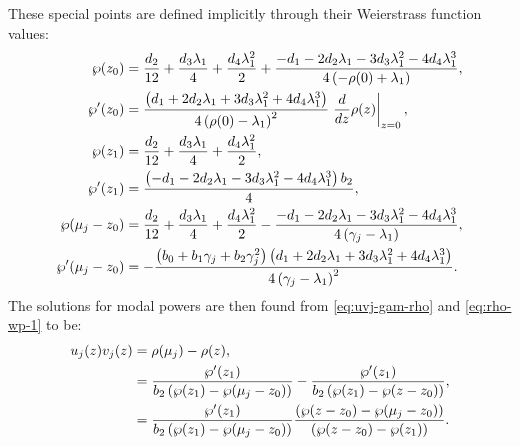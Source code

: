 \documentclass[11pt,a4paper]{article}
\numberwithin{equation}{section}
\begin{document}
These special points are defined implicitly through their Weierstrass function values:
\begin{align}
\wp{\left(z_{0}\right)} &= \frac{{d}_{2}}{12} + \frac{{d}_{3} {\lambda}_{1}}{4} + \frac{{d}_{4} {\lambda}_{1}^{2}}{2} + \frac{- {d}_{1} - 2 {d}_{2} {\lambda}_{1} - 3 {d}_{3} {\lambda}_{1}^{2} - 4 {d}_{4} {\lambda}_{1}^{3}}{4 \left(- \rho{\left(0 \right)} + {\lambda}_{1}\right)}, \notag \\
\wp'{\left(z_{0}\right)} &= \frac{\left({d}_{1} + 2 {d}_{2} {\lambda}_{1} + 3 {d}_{3} {\lambda}_{1}^{2} + 4 {d}_{4} {\lambda}_{1}^{3}\right) }{4 \left(\rho{\left(0 \right)} - {\lambda}_{1}\right)^{2}}\left. \frac{d}{d z} \rho{\left(z \right)} \right|_{\substack{ z=0 }}, \notag \\
\wp{\left(z_{1}\right)} &= \frac{{d}_{2}}{12} + \frac{{d}_{3} {\lambda}_{1}}{4} + \frac{{d}_{4} {\lambda}_{1}^{2}}{2}, \notag \\
\wp'{\left(z_{1}\right)} &= \frac{\left(- {d}_{1} - 2 {d}_{2} {\lambda}_{1} - 3 {d}_{3} {\lambda}_{1}^{2} - 4 {d}_{4} {\lambda}_{1}^{3}\right) b_2}{4}, \notag \\
\wp{\left({\mu}_{j} - z_{0}\right)} &= \frac{{d}_{2}}{12} + \frac{{d}_{3} {\lambda}_{1}}{4} + \frac{{d}_{4} {\lambda}_{1}^{2}}{2} - \frac{- {d}_{1} - 2 {d}_{2} {\lambda}_{1} - 3 {d}_{3} {\lambda}_{1}^{2} - 4 {d}_{4} {\lambda}_{1}^{3}}{4 \left({\gamma}_{j} - {\lambda}_{1}\right)}, \notag \\
\wp'{\left({\mu}_{j}- z_{0}\right)} &= - \frac{\left({b}_{0} + {b}_{1} {\gamma}_{j} + {b}_{2} {\gamma}_{j}^{2}\right) \left({d}_{1} + 2 {d}_{2} {\lambda}_{1} + 3 {d}_{3} {\lambda}_{1}^{2} + 4 {d}_{4} {\lambda}_{1}^{3}\right)}{4 \left({\gamma}_{j} - {\lambda}_{1}\right)^{2}}. \label{eq:wp-points}
\end{align}
The solutions for modal powers are then found from \eqref{eq:uvj-gam-rho} and \eqref{eq:rho-wp-1} to be:
\begin{align}
u_j{\left(z\right)} v_j{\left(z\right)} &= \rho(\mu_j) - \rho(z), \notag \\
&= \frac{\wp'{\left(z_{1}\right)}}{ b_2 \left(\wp{\left(z_{1}\right)} - \wp{\left({\mu}_{j} - z_{0}\right)}\right)} - \frac{\wp'{\left(z_{1}\right)}}{b_2 \left(\wp{\left(z_{1}\right)} - \wp{\left(z - z_{0}\right)}\right) }, \notag \\
&= \frac{\wp'{\left(z_{1}\right)} }{ b_2 \left(\wp{\left(z_{1}\right)} - \wp{\left({\mu}_{j}- z_{0}\right)}\right)} \frac{ \left(\wp{\left(z - z_{0}\right)} - \wp{\left({\mu}_{j} - z_{0}\right)}\right) }{ \left(\wp{\left(z - z_{0}\right)} - \wp{\left(z_{1}\right)}\right) }. \label{eq:uv-wp}
\end{align}
\end{document}
